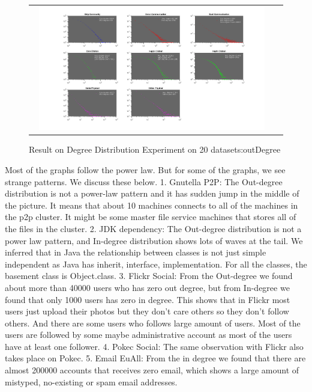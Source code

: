 \begin{figure}[H]
\begin{center}
\begin{tabular}{cc}
     \includegraphics[width=0.95\textwidth]{FIG/outdegree2.png}
\end{tabular}
\caption{Result on Degree Distribution Experiment on 20 datasets:outDegree}
\end{center}
\end{figure}

Most of the graphs follow the power law. But for some of the graphs, we see strange patterns. We discuss these below.
1. Gnutella P2P: The Out-degree distribution is not a power-law pattern and it has sudden jump in the middle of the picture. It means that about 10 machines connects to all of the machines in the p2p cluster. It might be some master file service machines that stores all of the files in the cluster.
2. JDK dependency: The Out-degree distribution is not a power law pattern, and In-degree distribution shows lots of waves at the tail. We inferred that in Java the relationship between classes is not just simple independent as Java has inherit, interface, implementation. For all the classes, the basement class is Object.class. 
3. Flickr Social: From the Out-degree we found about more than 40000 users who has zero out degree, but from In-degree we found that only 1000 users has zero in degree. This shows that in Flickr most users just upload their photos but they don't care others so they don't follow others. And there are some users who follows large amount of users. Most of the users are followed by some maybe administrative account as most of the users have at least one follower.
4. Pokec Social: The same observation with Flickr also takes place on Pokec.
5. Email EuAll: From the in degree we found that there are almost 200000 accounts that receives zero email, which shows a large amount of mistyped, no-existing or spam email addresses.


